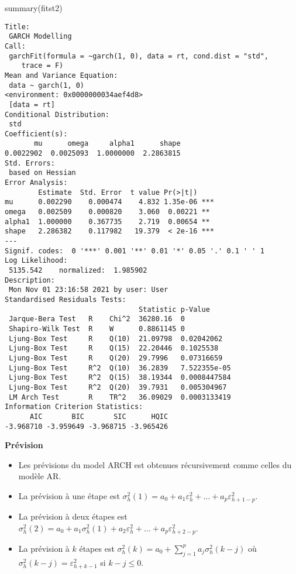 \documentclass[
  ignorenonframetext,
]{beamer}
\newenvironment{Shaded}{\begin{snugshade}}{\end{snugshade}}
\newcommand{\FunctionTok}[1]{\textcolor[rgb]{0.00,0.00,0.00}{#1}}
\newcommand{\NormalTok}[1]{#1}
\newenvironment{Shaded}{\begin{snugshade}}{\end{snugshade}}
\newcommand{\FunctionTok}[1]{\textcolor[rgb]{0.00,0.00,0.00}{#1}}
\newcommand{\NormalTok}[1]{#1}
\begin{document}
\begin{frame}[fragile]
\begin{Shaded}
\begin{Highlighting}[]
\FunctionTok{summary}\NormalTok{(fitst2)}
\end{Highlighting}
\end{Shaded}
\begin{verbatim}
Title:
 GARCH Modelling 
Call:
 garchFit(formula = ~garch(1, 0), data = rt, cond.dist = "std", 
    trace = F) 
Mean and Variance Equation:
 data ~ garch(1, 0)
<environment: 0x0000000034aef4d8>
 [data = rt]
Conditional Distribution:
 std 
Coefficient(s):
       mu      omega     alpha1      shape  
0.0022902  0.0025093  1.0000000  2.2863815  
Std. Errors:
 based on Hessian 
Error Analysis:
        Estimate  Std. Error  t value Pr(>|t|)    
mu      0.002290    0.000474    4.832 1.35e-06 ***
omega   0.002509    0.000820    3.060  0.00221 ** 
alpha1  1.000000    0.367735    2.719  0.00654 ** 
shape   2.286382    0.117982   19.379  < 2e-16 ***
---
Signif. codes:  0 '***' 0.001 '**' 0.01 '*' 0.05 '.' 0.1 ' ' 1
Log Likelihood:
 5135.542    normalized:  1.985902 
Description:
 Mon Nov 01 23:16:58 2021 by user: User 
Standardised Residuals Tests:
                                Statistic p-Value     
 Jarque-Bera Test   R    Chi^2  36280.16  0           
 Shapiro-Wilk Test  R    W      0.8861145 0           
 Ljung-Box Test     R    Q(10)  21.09798  0.02042062  
 Ljung-Box Test     R    Q(15)  22.20446  0.1025538   
 Ljung-Box Test     R    Q(20)  29.7996   0.07316659  
 Ljung-Box Test     R^2  Q(10)  36.2839   7.522355e-05
 Ljung-Box Test     R^2  Q(15)  38.19344  0.0008447584
 Ljung-Box Test     R^2  Q(20)  39.7931   0.005304967 
 LM Arch Test       R    TR^2   36.09029  0.0003133419
Information Criterion Statistics:
      AIC       BIC       SIC      HQIC 
-3.968710 -3.959649 -3.968715 -3.965426 
\end{verbatim}
\end{frame}
\begin{frame}
\textbf{Prévision}
\begin{itemize}[<+->]
\item
  Les prévisions du model ARCH est obtenues récursivement comme celles
  du modèle AR.
\item
  La prévision à une étape est
  \(\sigma^2_h(1)=a_0+a_1 \varepsilon^2_h+\ldots+a_p \varepsilon^2_{h+1-p}\).
\item
  La prévision à deux étapes est
  \(\sigma^2_h(2)=a_0+a_1 \sigma^2_h(1)+a_2\varepsilon^2_h+\ldots+a_p \varepsilon^2_{h+2-p}\).
\item
  La prévision à \(k\) étapes est
  \(\sigma^2_h(k)=a_0+\displaystyle \sum_{j=1}^pa_j\sigma^2_h(k-j)\) où
  \(\sigma^2_h(k-j)=\varepsilon^2_{h+k-1}\) si \(k-j \leq 0\).
\end{itemize}
\end{frame}
\end{document}
